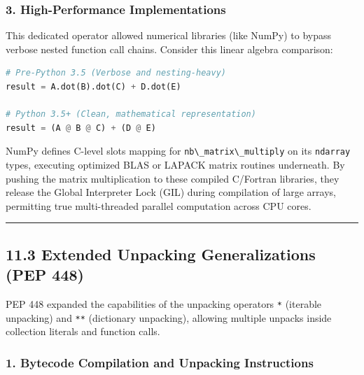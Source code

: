 \hypertarget{high-performance-implementations}{%
\subsubsection{3. High-Performance
Implementations}\label{high-performance-implementations}}

This dedicated operator allowed numerical libraries (like NumPy) to
bypass verbose nested function call chains. Consider this linear algebra
comparison:

\begin{lstlisting}[language=Python]
# Pre-Python 3.5 (Verbose and nesting-heavy)
result = A.dot(B).dot(C) + D.dot(E)

# Python 3.5+ (Clean, mathematical representation)
result = (A @ B @ C) + (D @ E)
\end{lstlisting}

NumPy defines C-level slots mapping for
\passthrough{\lstinline!nb\_matrix\_multiply!} on its
\passthrough{\lstinline!ndarray!} types, executing optimized BLAS or
LAPACK matrix routines underneath. By pushing the matrix multiplication
to these compiled C/Fortran libraries, they release the Global
Interpreter Lock (GIL) during compilation of large arrays, permitting
true multi-threaded parallel computation across CPU cores.

\begin{center}\rule{0.5\linewidth}{0.5pt}\end{center}

\hypertarget{extended-unpacking-generalizations-pep-448}{%
\subsection{11.3 Extended Unpacking Generalizations (PEP
448)}\label{extended-unpacking-generalizations-pep-448}}

PEP 448 expanded the capabilities of the unpacking operators
\passthrough{\lstinline!*!} (iterable unpacking) and
\passthrough{\lstinline!**!} (dictionary unpacking), allowing multiple
unpacks inside collection literals and function calls.

\hypertarget{bytecode-compilation-and-unpacking-instructions}{%
\subsubsection{1. Bytecode Compilation and Unpacking
Instructions}\label{bytecode-compilation-and-unpacking-instructions}}

